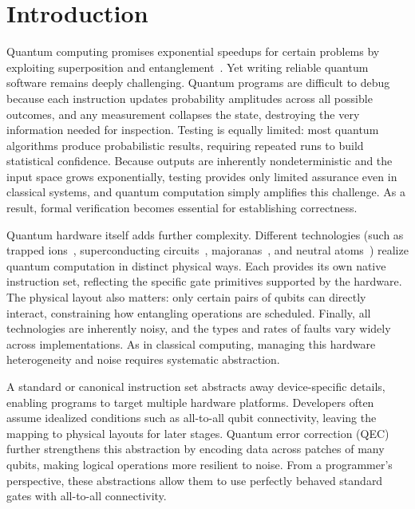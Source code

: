 \section{Introduction}

Quantum computing promises exponential speedups for certain problems by exploiting superposition and entanglement~\cite{shor1997,wecker-reactions,cao2018potential,gidney2025factor2048bitrsa,resourceestimation-beverland2022assessing}. Yet writing reliable quantum software remains deeply challenging. Quantum programs are difficult to debug because each instruction updates probability amplitudes across all possible outcomes, and any measurement collapses the state, destroying the very information needed for inspection. 
Testing is equally limited: most quantum algorithms produce probabilistic results, requiring repeated runs to build statistical confidence. Because outputs are inherently nondeterministic and the input space grows exponentially, testing provides only limited assurance even in classical systems, and quantum computation simply amplifies this challenge. As a result, formal verification becomes essential for establishing correctness.


Quantum hardware itself adds further complexity. Different technologies (such as trapped ions~\cite{DeCross_2025}, superconducting circuits~\cite{google2025quantum}, majoranas~\cite{microsoft2025interferometric}, and neutral atoms~\cite{bluvstein2024logical}) realize quantum computation in distinct physical ways. Each provides its own native instruction set, reflecting the specific gate primitives supported by the hardware. The physical layout also matters: only certain pairs of qubits can directly interact, constraining how entangling operations are scheduled. Finally, all technologies are inherently noisy, and the types and rates of faults vary widely across implementations. As in classical computing, managing this hardware heterogeneity and noise requires systematic abstraction.

A standard or canonical instruction set abstracts away device-specific details, enabling programs to target multiple hardware platforms. Developers often assume idealized conditions such as all-to-all qubit connectivity, leaving the mapping to physical layouts for later stages. Quantum error correction (QEC) further strengthens this abstraction by encoding data across patches of many qubits, making logical operations more resilient to noise. From a programmer's perspective, these abstractions allow them to use perfectly behaved standard gates with all-to-all connectivity.

